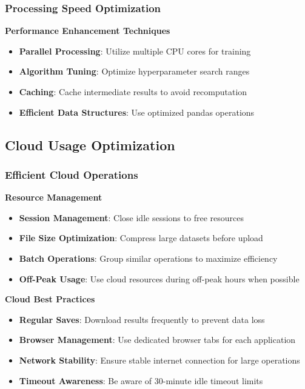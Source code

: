 \subsubsection{Processing Speed Optimization}

\textbf{Performance Enhancement Techniques}
\begin{itemize}
	\item \textbf{Parallel Processing}: Utilize multiple CPU cores for training
	\item \textbf{Algorithm Tuning}: Optimize hyperparameter search ranges
	\item \textbf{Caching}: Cache intermediate results to avoid recomputation
	\item \textbf{Efficient Data Structures}: Use optimized pandas operations
\end{itemize}


\subsection{Cloud Usage Optimization}

\subsubsection{Efficient Cloud Operations}

\textbf{Resource Management}
\begin{itemize}
	\item \textbf{Session Management}: Close idle sessions to free resources
	\item \textbf{File Size Optimization}: Compress large datasets before upload
	\item \textbf{Batch Operations}: Group similar operations to maximize efficiency
	\item \textbf{Off-Peak Usage}: Use cloud resources during off-peak hours when possible
\end{itemize}

\textbf{Cloud Best Practices}
\begin{itemize}
	\item \textbf{Regular Saves}: Download results frequently to prevent data loss
	\item \textbf{Browser Management}: Use dedicated browser tabs for each application
	\item \textbf{Network Stability}: Ensure stable internet connection for large operations
	\item \textbf{Timeout Awareness}: Be aware of 30-minute idle timeout limits
\end{itemize}

